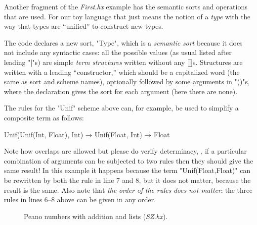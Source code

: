 \documentclass[11pt]{article} %
\begin{document}
\begin{example}\label{ex:unif}
  Another fragment of the \emph{First.hx} example has the semantic sorts and operations that are
  used. For our toy language that just means the notion of a \emph{type} with the way that types are
  ``unified'' to construct new types.
  The code declares a new sort, "Type", which is a \emph{semantic sort} because it does not include
  any syntactic cases: all the possible values (as usual listed after leading "|"s) are simple
  \emph{term structures} written without any ⟦⟧s.  Structures are written with a leading
  ``constructor,'' which should be a capitalized word (the same as sort and scheme names),
  optionally followed by some arguments in "()"s, where the declaration gives the sort for each
  argument (here there are none).

  The rules for the "Unif" scheme above can, for example, be used to simplify a composite term as
  follows:
  \begin{hacs}[xleftmargin=\parindent,xrightmargin=\parindent]
Unif(Unif(Int, Float), Int) → Unif(Float, Int) → Float
  \end{hacs}
  Note how overlaps are allowed but please do verify determinacy, \ie, if a particular combination
  of arguments can be subjected to two rules then they should give the same result! In this example
  it happens because the term "Unif(Float,Float)" can be rewritten by both the rule in line 7 and 8,
  but it does not matter, because the result is the same. Also note that \emph{the order of the
    rules does not matter}: the three rules in lines 6--8 above can be given in any order.
\end{example}

\begin{figure}[p]
  \caption{Peano numbers with addition and lists (\emph{SZ.hx}).}
  \label{fig:sz}
\end{figure}
\end{document}
